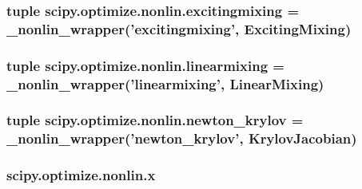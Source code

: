 \subsubsection[{excitingmixing}]{\setlength{\rightskip}{0pt plus 5cm}tuple scipy.\+optimize.\+nonlin.\+excitingmixing = \+\_\+nonlin\+\_\+wrapper('excitingmixing', {\bf Exciting\+Mixing})}\label{namespacescipy_1_1optimize_1_1nonlin_a6ca7d71e1146d29c858a2b10bbd0d251}
\hypertarget{namespacescipy_1_1optimize_1_1nonlin_ad51694d96aecd2e4264d995259d40631}{}
\subsubsection[{linearmixing}]{\setlength{\rightskip}{0pt plus 5cm}tuple scipy.\+optimize.\+nonlin.\+linearmixing = \+\_\+nonlin\+\_\+wrapper('linearmixing', {\bf Linear\+Mixing})}\label{namespacescipy_1_1optimize_1_1nonlin_ad51694d96aecd2e4264d995259d40631}
\hypertarget{namespacescipy_1_1optimize_1_1nonlin_a755c2bc3bfa3f62b3d94d5c96f2d4f76}{}
\subsubsection[{newton\+\_\+krylov}]{\setlength{\rightskip}{0pt plus 5cm}tuple scipy.\+optimize.\+nonlin.\+newton\+\_\+krylov = \+\_\+nonlin\+\_\+wrapper('newton\+\_\+krylov', {\bf Krylov\+Jacobian})}\label{namespacescipy_1_1optimize_1_1nonlin_a755c2bc3bfa3f62b3d94d5c96f2d4f76}
\hypertarget{namespacescipy_1_1optimize_1_1nonlin_a62a0f3035bdcf81487f3212938c9b377}{}
\subsubsection[{x}]{\setlength{\rightskip}{0pt plus 5cm}scipy.\+optimize.\+nonlin.\+x}\label{namespacescipy_1_1optimize_1_1nonlin_a62a0f3035bdcf81487f3212938c9b377}
